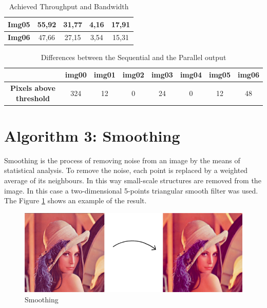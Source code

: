 \documentclass[a4paper]{article}
\begin{document}
\begin{table}[!ht]
\begin{tabular}{|l|c|c|c|c|}
\textbf{Img05}  & 55,92                                                                         & 31,77                                                                    & 4,16                                                                        & 17,91                                                                         \\ \hline
\textbf{Img06}  & 47,66                                                                         & 27,15                                                                    & 3,54                                                                        & 15,31                                                                         \\ \hline
\end{tabular}
\caption{Achieved Throughput and Bandwidth}
\label{tab:histo_mtb}
\end{table}
\FloatBarrier


\begin{table}[!ht]
\centering
\begin{tabular}{|c|l|c|c|l|l|l|l|}
\hline
\textbf{}                        & \textbf{img00}           & \textbf{img01} & \textbf{img02} & \textbf{img03}          & \textbf{img04}         & \textbf{img05}          & \textbf{img06}          \\ \hline
\textbf{Pixels above  threshold} & \multicolumn{1}{c|}{324} & 12             & 0              & \multicolumn{1}{c|}{24} & \multicolumn{1}{c|}{0} & \multicolumn{1}{c|}{12} & \multicolumn{1}{c|}{48} \\ \hline
\end{tabular}
\caption{Differences between the Sequential and the Parallel output}
\label{tab:pxabh}
\end{table}
\FloatBarrier
 
\newpage
\section{Algorithm 3: Smoothing}
\label{sec:smoo}
Smoothing is the process of removing noise from an image by the means of statistical analysis. To remove the noise, each point is replaced by a weighted average of its neighbours. In this way small-scale structures are removed from the image. In this case a two-dimensional 5-points triangular smooth filter was used. The Figure \ref{fig:smooth} shows an example of the result.

\begin{figure}[!ht]
    \centering
    \includegraphics[width=0.5\linewidth]{smooth}
    \caption{Smoothing}
    \label{fig:smooth}
\end{figure}
\FloatBarrier
\end{document}
